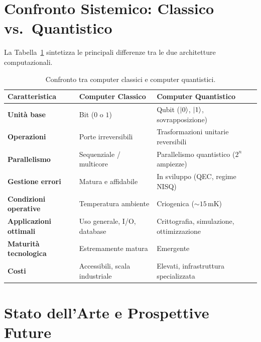 \section{Confronto Sistemico: Classico vs.\ Quantistico}
\label{sec:confronto}

La Tabella~\ref{tab:confronto} sintetizza le principali differenze tra le due
architetture computazionali.

\begin{table}[ht]
  \centering
  \renewcommand{\arraystretch}{1.3}
  \caption{Confronto tra computer classici e computer quantistici.}
  \label{tab:confronto}
  \begin{tabularx}{\textwidth}{>{\bfseries}lXX}
    \toprule
    Caratteristica      & Computer Classico               & Computer Quantistico \\
    \midrule
    Unità base          & Bit ($0$ o $1$)                 & Qubit ($\ket{0}$, $\ket{1}$, sovrapposizione) \\
    Operazioni          & Porte irreversibili              & Trasformazioni unitarie reversibili \\
    Parallelismo        & Sequenziale / multicore          & Parallelismo quantistico ($2^n$ ampiezze) \\
    Gestione errori     & Matura e affidabile              & In sviluppo (QEC, regime NISQ) \\
    Condizioni operative & Temperatura ambiente            & Criogenica ($\sim 15\,\text{mK}$) \\
    Applicazioni ottimali & Uso generale, I/O, database   & Crittografia, simulazione, ottimizzazione \\
    Maturità tecnologica & Estremamente matura             & Emergente \\
    Costi               & Accessibili, scala industriale  & Elevati, infrastruttura specializzata \\
    \bottomrule
  \end{tabularx}
\end{table}

\section{Stato dell'Arte e Prospettive Future}
\label{sec:stato}

